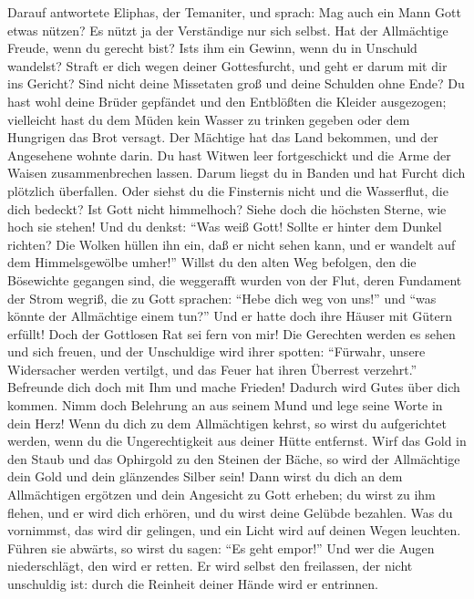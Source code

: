  Darauf antwortete Eliphas, der Temaniter, und sprach:
 Mag auch ein Mann Gott etwas nützen? Es nützt ja der
Verständige nur sich selbst.  Hat der Allmächtige Freude,
wenn du gerecht bist? Ist\textquotesingle s ihm ein Gewinn, wenn du in
Unschuld wandelst?  Straft er dich wegen deiner
Gottesfurcht, und geht er darum mit dir ins Gericht?  Sind
nicht deine Missetaten groß und deine Schulden ohne Ende? 
Du hast wohl deine Brüder gepfändet und den Entblößten die Kleider
ausgezogen;  vielleicht hast du dem Müden kein Wasser zu
trinken gegeben oder dem Hungrigen das Brot versagt.  Der
Mächtige hat das Land bekommen, und der Angesehene wohnte darin.
 Du hast Witwen leer fortgeschickt und die Arme der Waisen
zusammenbrechen lassen.  Darum liegst du in Banden und
hat Furcht dich plötzlich überfallen.  Oder siehst du die
Finsternis nicht und die Wasserflut, die dich bedeckt? 
Ist Gott nicht himmelhoch? Siehe doch die höchsten Sterne, wie hoch sie
stehen!  Und du denkst: ``Was weiß Gott! Sollte er hinter
dem Dunkel richten?  Die Wolken hüllen ihn ein, daß er
nicht sehen kann, und er wandelt auf dem Himmelsgewölbe umher!''
 Willst du den alten Weg befolgen, den die Bösewichte
gegangen sind,  die weggerafft wurden von der Flut, deren
Fundament der Strom wegriß,  die zu Gott sprachen: ``Hebe
dich weg von uns!'' und ``was könnte der Allmächtige einem tun?''
 Und er hatte doch ihre Häuser mit Gütern erfüllt! Doch
der Gottlosen Rat sei fern von mir!  Die Gerechten werden
es sehen und sich freuen, und der Unschuldige wird ihrer spotten:
 ``Fürwahr, unsere Widersacher werden vertilgt, und das
Feuer hat ihren Überrest verzehrt.''  Befreunde dich doch
mit Ihm und mache Frieden! Dadurch wird Gutes über dich kommen.
 Nimm doch Belehrung an aus seinem Mund und lege seine
Worte in dein Herz!  Wenn du dich zu dem Allmächtigen
kehrst, so wirst du aufgerichtet werden, wenn du die Ungerechtigkeit aus
deiner Hütte entfernst.  Wirf das Gold in den Staub und
das Ophirgold zu den Steinen der Bäche,  so wird der
Allmächtige dein Gold und dein glänzendes Silber sein! 
Dann wirst du dich an dem Allmächtigen ergötzen und dein Angesicht zu
Gott erheben;  du wirst zu ihm flehen, und er wird dich
erhören, und du wirst deine Gelübde bezahlen.  Was du
vornimmst, das wird dir gelingen, und ein Licht wird auf deinen Wegen
leuchten.  Führen sie abwärts, so wirst du sagen: ``Es
geht empor!'' Und wer die Augen niederschlägt, den wird er retten.
 Er wird selbst den freilassen, der nicht unschuldig ist:
durch die Reinheit deiner Hände wird er entrinnen.

